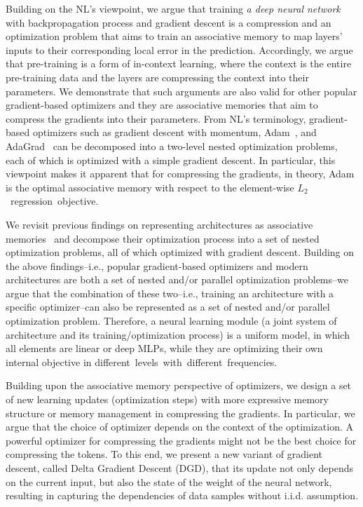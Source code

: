 \documentclass{article}
\newcommand{\citep}{\parencite}
\newcommand{\head}[1]{\vspace{1.7mm}\noindent{{\textcolor{c4}{\bf #1.}}}}
\begin{document}
\head{Optimizers and Architectures as Learning Module (\textcolor{black}{\S\ref{sec:DeepOptimizers}, \S\ref{sec:arch})}}
Building on the NL's viewpoint, we argue that training \emph{a deep neural network} with backpropagation process and gradient descent is a compression and an optimization problem that aims to train an associative memory to map layers' inputs to their corresponding local error in the prediction. Accordingly, we argue that pre-training is a form of in-context learning, where the context is the entire pre-training data and the layers are compressing the context into their parameters. We demonstrate that such arguments are also valid for other popular gradient-based optimizers and they are associative memories that aim to compress the gradients into their parameters. From NL's terminology, gradient-based optimizers such as gradient descent with momentum, Adam~\citep{kingma2014adam}, and AdaGrad~\citep{duchi2011adaptive} can be decomposed into a two-level nested optimization problems, each of which is optimized with a simple gradient descent. In particular, this viewpoint makes it apparent that for compressing the gradients, in theory, Adam is the optimal associative memory with respect to the element-wise $L_2$~regression~objective.

We revisit previous findings on representing architectures as associative memories~\citep{behrouz2025Miras} and decompose their optimization process into a set of nested optimization problems, all of which optimized with gradient descent. Building on the above findings–i.e., popular gradient-based optimizers and modern architectures are both a set of nested and/or parallel optimization problems–we argue that the combination of these two–i.e., training an architecture with a specific optimizer–can also be represented as a set of nested and/or parallel optimization problem. Therefore, a neural learning module (a joint system of architecture and its training/optimization process) is a uniform model, in which all elements are linear or deep MLPs, while they are optimizing their own internal objective in different~levels~with~different~frequencies. 

Building upon the associative memory perspective of optimizers, we design a set of new learning updates (optimization steps) with more expressive memory structure or memory management in compressing the gradients. In particular, we argue that the choice of optimizer depends on the context of the optimization. A powerful optimizer for compressing the gradients might not be the best choice for compressing the tokens. To this end, we present a new variant of gradient descent, called Delta Gradient Descent (DGD), that its update not only depends on the current input, but also the state of the weight of the neural network, resulting in capturing the dependencies of data samples without i.i.d. assumption. 
\end{document}
